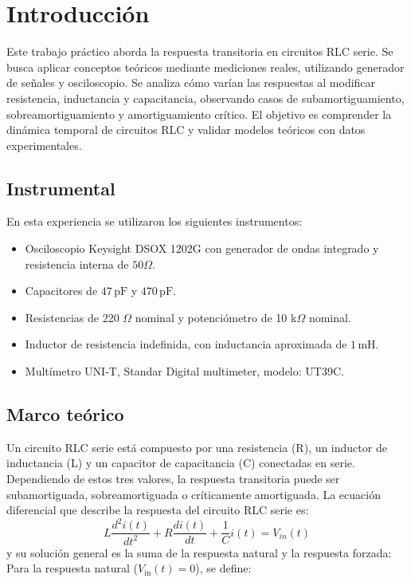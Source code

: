 \documentclass{article}
\begin{document}
\newpage

\tableofcontents %
\newpage

\section{Introducción}
    Este trabajo práctico aborda la respuesta transitoria
     en circuitos RLC serie. Se busca aplicar conceptos 
     teóricos mediante mediciones reales, utilizando generador 
     de señales y osciloscopio. Se analiza cómo varían las
      respuestas al modificar resistencia, inductancia y 
      capacitancia, observando casos de subamortiguamiento,
       sobreamortiguamiento y amortiguamiento crítico. 
       El objetivo es comprender la dinámica temporal 
       de circuitos RLC y validar modelos teóricos
       con datos experimentales.
    \subsection{Instrumental}
        En esta experiencia se utilizaron los siguientes instrumentos:
\begin{itemize}
  \item Osciloscopio Keysight DSOX 1202G con generador de ondas integrado y resistencia interna de $50 \Omega$.
  \item Capacitores de $47\,\text{pF}$ y $470\,\text{pF}$.
  \item Resistencias de 220 $\Omega$ nominal y potenciómetro de 10 k$\Omega$ nominal.
  \item Inductor de resistencia indefinida, con inductancia aproximada de $1\,\text{mH}$.
  \item Multímetro UNI-T,  Standar Digital multimeter, modelo: UT39C.
\end{itemize}

\subsection{Marco teórico}

    Un circuito RLC serie está compuesto por una resistencia (R), un inductor de inductancia (L) y un capacitor de
    capacitancia (C) conectadas en serie. Dependiendo de estos tres valores, la respuesta transitoria
    puede ser subamortiguada, sobreamortiguada o críticamente 
    amortiguada. La ecuación diferencial que describe la 
    respuesta del circuito RLC serie es:
    \begin{equation}
        L\frac{d^2i(t)}{dt^2} + R\frac{di(t)}{dt} + \frac{1}{C}i(t) = V_{in}(t)
    \end{equation}
    y su solución general es la suma de la respuesta natural y la respuesta forzada:
Para la respuesta natural (\( V_{\text{in}}(t) = 0 \)), se define:
\end{document}
